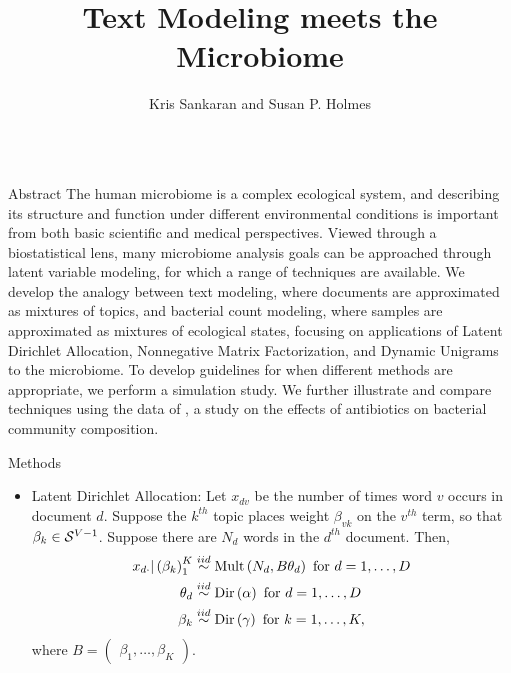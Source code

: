 \documentclass[final]{beamer}
\title{Text Modeling meets the Microbiome}
\author{Kris Sankaran and Susan P. Holmes}
\institute{Department of Statistics, Stanford University}
\newlength{\onecolwid}
\begin{document}

\begin{frame}

\begin{columns}
\begin{column}{\onecolwid}

\begin{block}{Abstract}
The human microbiome is a complex ecological system, and describing its
structure and function under different environmental conditions is important
from both basic scientific and medical perspectives. Viewed through a
biostatistical lens, many microbiome analysis goals can be approached through
latent variable modeling, for which a range of techniques are available. We
develop the analogy between text modeling, where documents are approximated as
mixtures of topics, and bacterial count modeling, where samples are approximated
as mixtures of ecological states, focusing on applications of Latent Dirichlet
Allocation, Nonnegative Matrix Factorization, and Dynamic Unigrams to the
microbiome. To develop guidelines for when different methods are appropriate, we
perform a simulation study. We further illustrate and compare techniques using
the data of \citep{dethlefsen2011incomplete}, a study on the effects of
antibiotics on bacterial community composition.
\end{block}

\begin{block}{Methods}
  \begin{itemize}


\item Latent Dirichlet Allocation: Let $x_{dv}$ be the number of times word $v$
  occurs in document $d$. Suppose the $k^{th}$ topic places weight $\beta_{vk}$
  on the $v^{th}$ term, so that $\beta_{k} \in \mathcal{S}^{V - 1}$. Suppose there
  are $N_{d}$ words in the $d^{th}$ document. Then,
\begin{align*}
x_{d\cdot} \vert \left(\beta_{k}\right)_{1}^{K} &\overset{iid}{\sim} \textnormal{Mult}\left(N_{d}, B\theta_{d}\right) \text{ for } d = 1, \dots, D\\
\theta_{d} &\overset{iid}{\sim} \textnormal{Dir}\left(\alpha\right) \text{ for } d = 1, \dots, D \\
\beta_{k} &\overset{iid}{\sim} \textnormal{Dir}\left(\gamma\right) \text{ for }k = 1, \dots, K,
\end{align*}
where $B = \begin{pmatrix}\beta_{1}, \dots, \beta_{K}\end{pmatrix}$.


\end{itemize}
\end{block}
\end{column}
\end{columns}
\end{frame}
\end{document}
